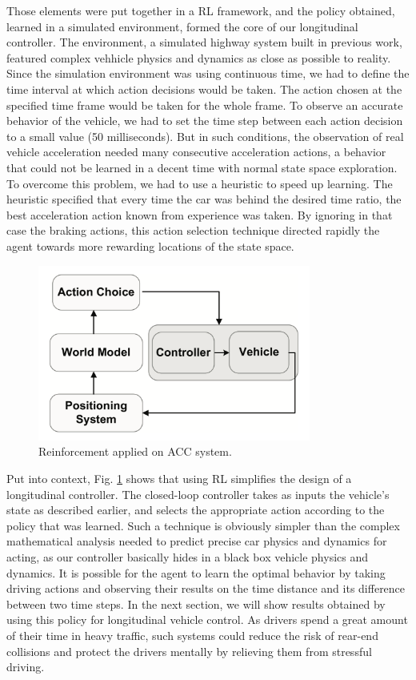 Those elements were put together in a RL framework, and the policy obtained, learned in a simulated environment, formed the core of our longitudinal controller. The environment, a simulated highway system built in previous work, featured complex vehhicle physics and dynamics as close as possible to reality. Since the simulation environment was using continuous time, we had to define the time interval at which action decisions would be taken. The action chosen at the specified time frame would be taken for the whole frame. To observe an accurate behavior of the vehicle, we had to set the time step between each action decision to a small value (50 milliseconds). But in such conditions, the observation of real vehicle acceleration needed many consecutive acceleration actions, a behavior that could not be learned in a decent time with normal state space exploration. To overcome this problem, we had to use a heuristic to speed up learning. The heuristic specified that every time the car was behind the desired time ratio, the best acceleration action known from experience was taken. By ignoring in that case the braking actions, this action selection technique directed rapidly the agent towards more rewarding locations of the state space.

\begin{figure}[h]
\centering
\includegraphics[width=0.8\textwidth]{figs/ch4/acc-drl}
\caption{Reinforcement applied on ACC system.}
\label{fig:acc-rl}
\end{figure}

Put into context, Fig. \ref{fig:acc-rl} shows that using RL simplifies the design of a longitudinal controller. The closed-loop controller takes as inputs the vehicle's state as described earlier, and selects the appropriate action according to the policy that was learned. Such a technique is obviously simpler than the complex mathematical analysis needed to predict precise car physics and dynamics for acting, as our controller basically hides in a black box vehicle physics and dynamics. It is possible for the agent to learn the optimal behavior by taking driving actions and observing their results on the time distance and its difference between two time steps. In the next section, we will show results obtained by using this policy for longitudinal vehicle control. As drivers spend a great amount of their time in heavy traffic, such systems could reduce the risk of rear-end collisions and protect the drivers mentally by relieving them from stressful driving.

